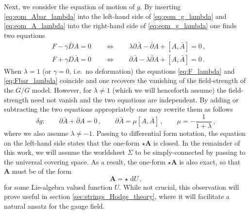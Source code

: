 \documentclass[11pt,a4paper]{article}
\numberwithin{equation}{section}
\numberwithin{table}{section}\setlength{\multlinegap}{25pt}
\newcommand{\dd}{\mathrm{d}}
\begin{document}
Next, we consider the equation of motion of $g$. By inserting \eqref{eq:eom_Abar_lambda} into the left-hand side of \eqref{eq:eom_g_lambda} and \eqref{eq:eom_A_lambda} into the right-hand side of \eqref{eq:eom_g_lambda} one finds two equations
\begin{align}
	\label{eq:F_lambda}	&F-\gamma \bar{D}A = 0\qquad \iff \qquad  \lambda\partial\bar{A} - \bar{\partial}A+[A,\bar{A}] = 0\,,\\
	\label{eq:Fbar_lambda}	&F+\gamma D\bar{A}= 0\qquad \iff \qquad \partial\bar{A} - \lambda\bar{\partial}A+[A,\bar{A}] = 0\,.
\end{align}
When $\lambda=1$ (or $\gamma=0$, i.e.~no deformation) the equations \eqref{eq:F_lambda} and \eqref{eq:Fbar_lambda} coincide and one recovers the vanishing of the field-strength of the $G/G$ model. However, for $\lambda\neq 1$ (which we will henceforth assume) the field-strength need not vanish and the two equations are independent. By adding or subtracting the two equations appropriately one may rewrite them as follows
\begin{equation}\label{eq:eomg_full}
	\delta g:\qquad \partial\bar{A}+\bar{\partial}A = 0\,,\qquad \partial\bar{A} = \mu[A,\bar{A}]\,,\qquad \mu=-\frac{1}{1+\lambda}\,,
\end{equation}
where we also assume $\lambda\neq -1$. Passing to differential form notation, the equation on the left-hand side states that the one-form $\star\mathbf{A}$ is closed. In the remainder of this work, we will assume the worldsheet $\Sigma$ to be simply-connected by passing to the universal covering space. As a result, the one-form $\star\mathbf{A}$ is also exact, so that $\mathbf{A}$ must be of the form
\begin{equation}\label{eq:starA_closed}
	\mathbf{A} = \star\;\dd U\,,
\end{equation}
for some Lie-algebra valued function $U$. While not crucial, this observation will prove useful in section \ref{sec:strings_Hodge_theory}, where it will facilitate a natural ansatz for the gauge field.
\end{document}
